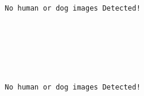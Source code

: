 \documentclass[11pt]{article}
\begin{document}
    \begin{center}
    \end{center}
    { \hspace*{\fill} \\}
    
    \begin{Verbatim}[commandchars=\\\{\}]
No human or dog images Detected!

    \end{Verbatim}

    \begin{center}
    \end{center}
    { \hspace*{\fill} \\}
    
    \begin{center}
    \end{center}
    { \hspace*{\fill} \\}
    
    \begin{center}
    \end{center}
    { \hspace*{\fill} \\}
    
    \begin{Verbatim}[commandchars=\\\{\}]
No human or dog images Detected!

    \end{Verbatim}

    \begin{center}
    \end{center}
    { \hspace*{\fill} \\}
    
    \begin{center}
    \end{center}
    { \hspace*{\fill} \\}
    

    
    
    
    
\end{document}
